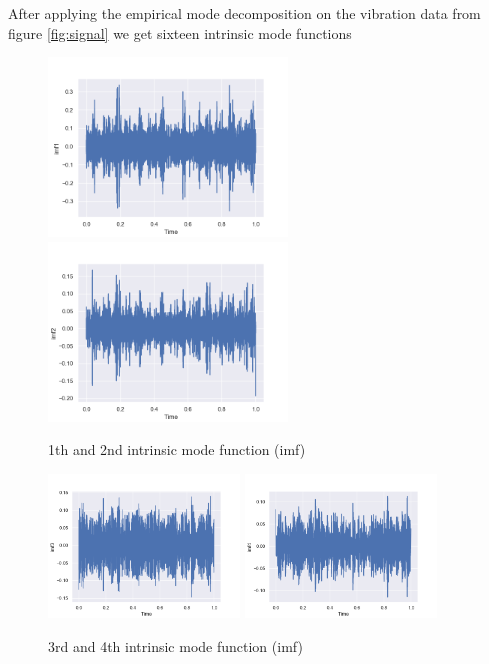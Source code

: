 \documentclass[11pt, oneside]{article}   	%
\begin{document}
\begin{flushleft}
After applying the empirical mode decomposition on the vibration data from figure \ref{fig:signal} we get sixteen  intrinsic mode functions
\begin{figure}[H] %
   \centering
   \includegraphics[width=2.5in]{imf/imf1.png} 
     \includegraphics[width=2.5in]{imf/imf2.png} 
   \caption{1th and 2nd intrinsic mode function (imf)}
   \label{fig:imf11}
\end{figure}

\begin{figure}[H] %
   \centering
   \includegraphics[width=2in]{imf/imf3.png} 
     \includegraphics[width=2in]{imf/imf4.png} 
   \caption{3rd and 4th intrinsic mode function (imf)}
   \label{fig:imf34}
\end{figure}


\end{flushleft}
\end{document}
